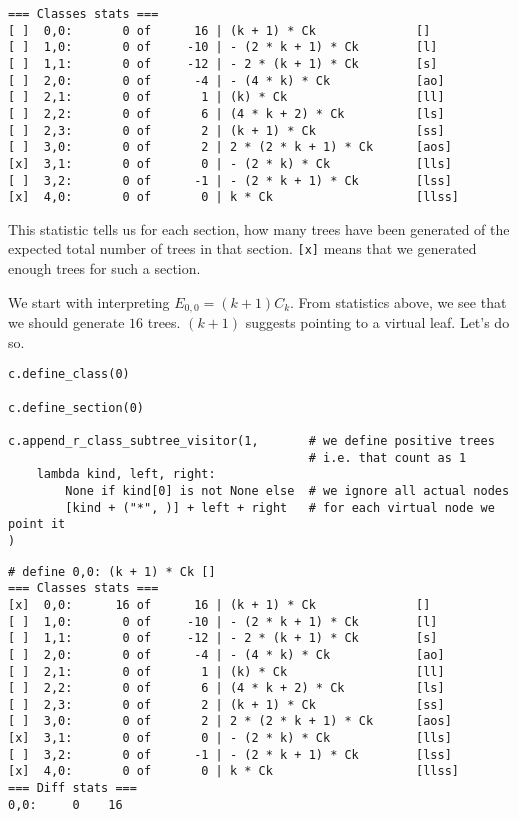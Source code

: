 \documentclass[final]{article}
\theoremstyle{definition}
\theoremstyle{remark}
\begin{document}
\begin{lstlisting}
=== Classes stats ===
[ ]  0,0:       0 of      16 | (k + 1) * Ck              []
[ ]  1,0:       0 of     -10 | - (2 * k + 1) * Ck        [l]
[ ]  1,1:       0 of     -12 | - 2 * (k + 1) * Ck        [s]
[ ]  2,0:       0 of      -4 | - (4 * k) * Ck            [ao]
[ ]  2,1:       0 of       1 | (k) * Ck                  [ll]
[ ]  2,2:       0 of       6 | (4 * k + 2) * Ck          [ls]
[ ]  2,3:       0 of       2 | (k + 1) * Ck              [ss]
[ ]  3,0:       0 of       2 | 2 * (2 * k + 1) * Ck      [aos]
[x]  3,1:       0 of       0 | - (2 * k) * Ck            [lls]
[ ]  3,2:       0 of      -1 | - (2 * k + 1) * Ck        [lss]
[x]  4,0:       0 of       0 | k * Ck                    [llss]
\end{lstlisting}

This statistic tells us for each section, how many trees have been generated of the expected total number of trees in that section. \verb|[x]| means that we generated enough trees for such a section.

We start with interpreting \(E_{0,0} = (k + 1) C_k\). From statistics above, we see that we should generate \(16\) trees. \((k + 1)\) suggests pointing to a virtual leaf. Let's do so.

\begin{lstlisting}
c.define_class(0)

c.define_section(0)

c.append_r_class_subtree_visitor(1,       # we define positive trees
                                          # i.e. that count as 1
    lambda kind, left, right:
        None if kind[0] is not None else  # we ignore all actual nodes
        [kind + ("*", )] + left + right   # for each virtual node we point it
)
\end{lstlisting}

\begin{lstlisting}
# define 0,0: (k + 1) * Ck []
=== Classes stats ===
[x]  0,0:      16 of      16 | (k + 1) * Ck              []
[ ]  1,0:       0 of     -10 | - (2 * k + 1) * Ck        [l]
[ ]  1,1:       0 of     -12 | - 2 * (k + 1) * Ck        [s]
[ ]  2,0:       0 of      -4 | - (4 * k) * Ck            [ao]
[ ]  2,1:       0 of       1 | (k) * Ck                  [ll]
[ ]  2,2:       0 of       6 | (4 * k + 2) * Ck          [ls]
[ ]  2,3:       0 of       2 | (k + 1) * Ck              [ss]
[ ]  3,0:       0 of       2 | 2 * (2 * k + 1) * Ck      [aos]
[x]  3,1:       0 of       0 | - (2 * k) * Ck            [lls]
[ ]  3,2:       0 of      -1 | - (2 * k + 1) * Ck        [lss]
[x]  4,0:       0 of       0 | k * Ck                    [llss]
=== Diff stats ===
0,0:     0    16
\end{lstlisting}
\end{document}
